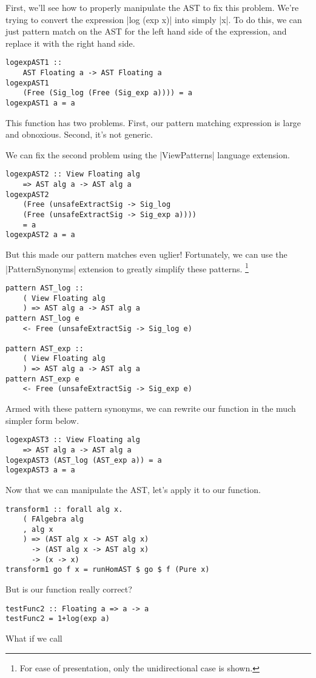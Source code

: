 \documentclass[preprint]{sigplanconf}
\theoremstyle{definition}
\begin{document}
First, we'll see how to properly manipulate the AST to fix this problem.
We're trying to convert the expression |log (exp x)| into simply |x|.
To do this, we can just pattern match on the AST for the left hand side of the expression,
and replace it with the right hand side.
\begin{lstlisting}
logexpAST1 ::
    AST Floating a -> AST Floating a
logexpAST1
    (Free (Sig_log (Free (Sig_exp a)))) = a
logexpAST1 a = a
\end{lstlisting}
This function has two problems.
First, our pattern matching expression is large and obnoxious.
Second, it's not generic.

We can fix the second problem using the |ViewPatterns| language extension.
\begin{lstlisting}
logexpAST2 :: View Floating alg
    => AST alg a -> AST alg a
logexpAST2
    (Free (unsafeExtractSig -> Sig_log
    (Free (unsafeExtractSig -> Sig_exp a))))
    = a
logexpAST2 a = a
\end{lstlisting}
But this made our pattern matches even uglier!
Fortunately, we can use the |PatternSynonyms| extension to greatly simplify these patterns.
\footnote{
    For ease of presentation, only the unidirectional case is shown.
}
\begin{lstlisting}
pattern AST_log ::
    ( View Floating alg
    ) => AST alg a -> AST alg a
pattern AST_log e
    <- Free (unsafeExtractSig -> Sig_log e)

pattern AST_exp ::
    ( View Floating alg
    ) => AST alg a -> AST alg a
pattern AST_exp e
    <- Free (unsafeExtractSig -> Sig_exp e)
\end{lstlisting}
Armed with these pattern synonyms, we can rewrite our function in the much simpler form below.
\begin{lstlisting}
logexpAST3 :: View Floating alg
    => AST alg a -> AST alg a
logexpAST3 (AST_log (AST_exp a)) = a
logexpAST3 a = a
\end{lstlisting}
Now that we can manipulate the AST, let's apply it to our function.
\begin{lstlisting}
transform1 :: forall alg x.
    ( FAlgebra alg
    , alg x
    ) => (AST alg x -> AST alg x)
      -> (AST alg x -> AST alg x)
      -> (x -> x)
transform1 go f x = runHomAST $ go $ f (Pure x)
\end{lstlisting}


But is our function really correct?
\begin{lstlisting}
testFunc2 :: Floating a => a -> a
testFunc2 = 1+log(exp a)
\end{lstlisting}
What if we call
\end{document}
